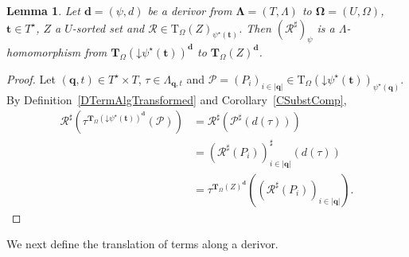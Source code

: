 \documentclass[a4paper, reqno]{amsbook}
\newcommand{\bb}[1]{\ensuremath{\lvert #1 \rvert}}
\newcommand{\vs}[1]{\mathbin{\downarrow}#1}
\newcommand{\sig}[1]{\mathbf{#1}}             %
\theoremstyle{plain}
\newtheorem{lemma}[theorem]{Lemma}
\theoremstyle{definition}
\begin{document}
\begin{lemma}\label{LSubstTransformedHom}
Let $\mathbf{d}=(\psi,d)$ be a derivor from $\sig{\Lambda}=(T,\Lambda)$ to $\sig{\Omega}=(U,\Omega)$, $\mathbf{t}\in T^{\star}$, $Z$ a $U$-sorted set and $\mathcal{R}\in\mathrm{T}_{\Omega}(Z)_{\psi^{\star}(\mathbf{t})}$.
Then $(\mathcal{R}^{\sharp})_{\psi}$ is a $\Lambda$-homomorphism from $\mathbf{T}_{\Omega}(\vs{\psi^{\star}(\mathbf{t})})^{\mathbf{d}}$ to $\mathbf{T}_{\Omega}(Z)^{\mathbf{d}}$.
\end{lemma}
\begin{proof}
Let $(\mathbf{q},t)\in T^{\star}\times T$, $\tau\in\Lambda_{\mathbf{q},t}$ and $\mathcal{P}=(P_{i})_{i\in\bb{\mathbf{q}}}\in\mathrm{T}_{\Omega}(\vs{\psi^{\star}(\mathbf{t})})_{\psi^{\star}(\mathbf{q})}$.
By Definition~\ref{DTermAlgTransformed} and Corollary~\ref{CSubstComp},
\begin{align*}
\mathcal{R}^{\sharp}\left(\tau^{\mathbf{T}_{\Omega}(\vs{\psi^{\star}(\mathbf{t})})^{\mathbf{d}}}(\mathcal{P})\right)
&=\mathcal{R}^{\sharp}\left(\mathcal{P}^{\sharp}(d(\tau))\right)
\\&=\left(\mathcal{R}^{\sharp}(P_{i})\right)^{\sharp}_{i\in\bb{\mathbf{q}}}(d(\tau))
\\&=\tau^{\mathbf{T}_{\Omega}(Z)^{\mathbf{d}}}\left(\left(\mathcal{R}^{\sharp}(P_{i})\right)_{i\in\bb{\mathbf{q}}}\right).
\end{align*}
\end{proof}

We next define the translation of terms along a derivor.
\end{document}
